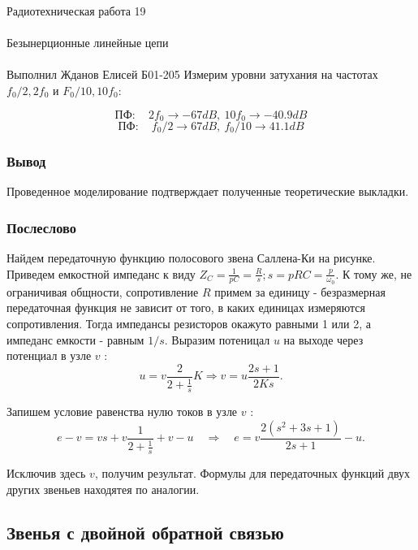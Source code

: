 \documentclass{astroedu-lab}
\begin{document}
\begin{problem}{\huge Радиотехническая работа 19\\\\Безынерционные линейные цепи\\\\Выполнил Жданов Елисей Б01-205}
 Измерим уровни затухания на частотах $f_0 / 2, 2f_0$ и $F_0 / 10, 10f_0$:

\[\textit{ПФ}: \quad 2f_0 \rightarrow -67 dB, \: 10f_0 \rightarrow -40.9 dB\]
\[\textit{ПФ}: \quad f_0 / 2 \rightarrow 67 dB, \: f_0 / 10 \rightarrow 41.1 dB\]

\subsubsection{Вывод}

Проведенное моделирование подтверждает полученные теоретические выкладки.

\subsubsection{Послеслово}

Найдем передаточную функцию полосового звена Саллена-Ки на рисунке. Приведем емкостной импеданс к виду
$Z_C=\frac{1}{p C}=\frac{R}{s} ; s=p R C=\frac{p}{\omega_0}$. К тому же, не ограничивая общности, сопротивление $R$ примем за единицу - безразмерная передаточная функция не зависит от того, в каких единицах измеряются сопротивления. Тогда импедансы резисторов окажуто равными 1 или 2, а импеданс емкости - равным $1 / s$.
Выразим потеницал $u$ на выходе через потенциал в узле $v$ :
$$
u=v \frac{2}{2+\frac{1}{s}} K \Rightarrow v=u \frac{2 s+1}{2 K s} .
$$

Запишем условие равенства нулю токов в узле $v$ :
$$
e-v=v s+v \frac{1}{2+\frac{1}{s}}+v-u \quad \Rightarrow \quad e=v \frac{2\left(s^2+3 s+1\right)}{2 s+1}-u .
$$

Исключив здесь $v$, получим результат.
Формулы для передаточных функций двух других звеньев находятея по аналогии.

\newpage

\subsection{Звенья с двойной обратной связью}


\end{problem}
\end{document}

